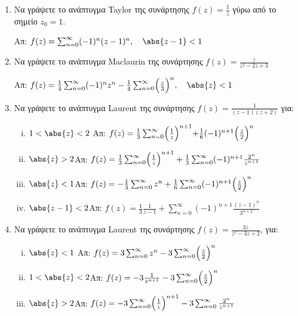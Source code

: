 




\everymath{\displaystyle}



\begin{center}
\end{center}

\vspace{\baselineskip} 

\begin{enumerate}

\item Να γράψετε το ανάπτυγμα \textlatin{Taylor} της συνάρτησης $f(z)=\frac{1}{z}$ γύρω από το σημείο $z_0=1$. 

\hfill Απ: $f(z)=\sum_{n=0}^{\infty}(-1)^n(z-1)^n, \quad \abs{z-1}<1$

\item Να γράψετε το ανάπτυγμα \textlatin{Maclaurin} της συνάρτησης $f(z)=\frac{z}{z^2-2z+3}$

\hfill Απ: $f(z)=\frac{1}{4}\sum_{n=0}^{\infty}(-1)^nz^n-\frac{1}{4}\sum_{n=0}^{\infty}\Bigl(\frac{z}{3}\Bigr)^n, \quad \abs{z}<1$

\item Να γράψετε το ανάπτυγμα \textlatin{Laurent} της συνάρτησης $f(z)=\frac{1}{(z-1)(z+2)}$ για:

\begin{enumerate}[i)]
\item $1<\abs{z}<2$ \hfill Απ: $f(z)=\frac{1}{3}\sum_{n=0}^{\infty}\Bigl(\frac{1}{z}\Bigl)^{n+1}+\frac{1}{6}(-1)^{n+1}\Bigl(\frac{z}{2}\Bigl)^n$
\item $\abs{z}>2$\hfill Απ: $f(z)=\frac{1}{3}\sum_{n=0}^{\infty}\Bigl(\frac{1}{z}\Big)^{n+1}+\frac{1}{3}\sum_{n=0}^{\infty}(-1)^{n+1}\frac{2^n}{z^{n+1}}$
\item $\abs{z}<1$\hfill Απ: $f(z)=-\frac{1}{3}\sum_{n=0}^{\infty}z^n+\frac{1}{6}\sum_{n=0}^{\infty}(-1)^{n+1}\Bigl(\frac{z}{2}\Bigr)^n$
\item $\abs{z-1}<2$\hfill Απ: $f(z)=\frac{1}{3}\frac{1}{z-1}+\sum_{n=0}^{\infty}(-1)^{n+1}\frac{(z-1)^n}{3^{n+2}}$
\end{enumerate}


\item Να γράψετε το ανάπτυγμα \textlatin{Laurent} της συνάρτησης $f(z)=\frac{3z}{z^2-3z+2}$, για: 

\begin{enumerate}[i)]
\item $\abs{z}<1\hfill$  Απ: $f(z)=3\sum_{n=0}^{\infty}z^n-3\sum_{n=0}^{\infty}\Bigl(\frac{z}{2}\Bigr)^n$
\item $1<\abs{z}<2$\hfill Απ: $f(z)=-3\frac{1}{z^{n+1}}-3\sum_{n=0}^{\infty}\Bigl(\frac{z}{2}\Bigr)^n$
\item $\abs{z}>2$\hfill Απ: $f(z)=-3\sum_{n=0}^{\infty}\Bigl(\frac{1}{z}\Bigr)^{n+1}-3\sum_{n=0}^{\infty}\frac{2^n}{z^{n+1}}$
\end{enumerate}


\end{enumerate}
